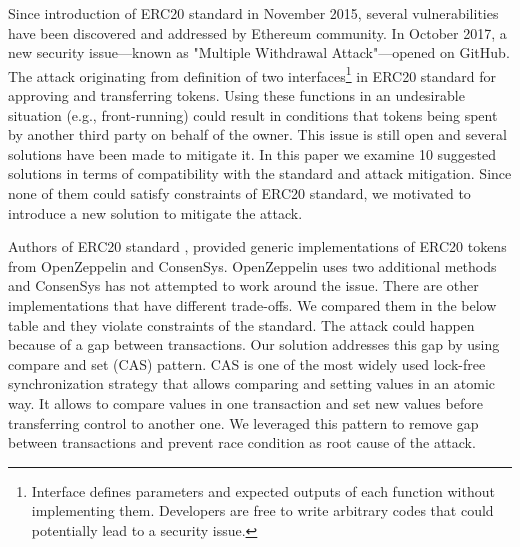 Since introduction of ERC20 standard in November 2015, several vulnerabilities have been discovered and addressed by Ethereum community. In October 2017, a new security issue---known as "Multiple Withdrawal Attack"---opened on GitHub\cite{Ref13,Ref07}. The attack originating from definition of two interfaces\footnote{Interface defines parameters and expected outputs of each function without implementing them. Developers are free to write arbitrary codes that could potentially lead to a security issue.} in ERC20 standard for approving and transferring tokens. Using these functions in an undesirable situation (e.g., front-running) could result in conditions that tokens being spent by another third party on behalf of the owner. This issue is still open and several solutions have been made to mitigate it. In this paper we examine 10 suggested solutions in terms of compatibility with the standard and attack mitigation. Since none of them could satisfy constraints of ERC20 standard, we motivated to introduce a new solution to mitigate the attack.

Authors of ERC20 standard \cite{Ref08}, provided generic implementations of ERC20 tokens from OpenZeppelin\cite{Ref10} and ConsenSys\cite{Ref11}. OpenZeppelin uses two additional methods and ConsenSys has not attempted to work around the issue. There are other implementations that have different trade-offs. We compared them in the below table and they violate constraints of the standard. The attack could happen because of a gap between transactions. Our solution addresses this gap by using compare and set (CAS) pattern\cite{Ref06}. CAS is one of the most widely used lock-free synchronization strategy that allows comparing and setting values in an atomic way. It allows to compare values in one transaction and set new values before transferring control to another one. We leveraged this pattern to remove gap between transactions and prevent race condition as root cause of the attack.

